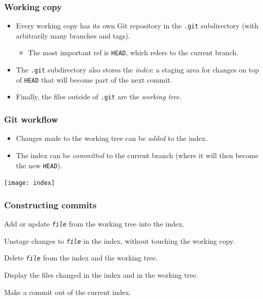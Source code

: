 \documentclass{beamer}
\begin{document}
\begin{frame}
  \frametitle{Working copy}
  \begin{itemize}
  \item Every working copy has its own Git repository in the
    \texttt{.git} subdirectory (with arbitrarily many branches and
    tags).
    \begin{itemize}
    \item The most important ref is \texttt{HEAD}, which refers to the
      current branch.
    \end{itemize}
  \item The \texttt{.git} subdirectory also stores the \emph{index}: a
    staging area for changes on top of \texttt{HEAD} that will become
    part of the next commit.
  \item Finally, the files outside of \texttt{.git} are the
    \emph{working tree}.
  \end{itemize}
\end{frame}

\begin{frame}
  \frametitle{Git workflow}
  \begin{itemize}
  \item Changes made to the working tree can be \emph{added} to the
    index.
  \item The index can be \emph{committed} to the current branch (where
    it will then become the new \texttt{HEAD}).
  \end{itemize}

  \begin{center}
    \texttt{[image: index]}
  \end{center}
\end{frame}

\begin{frame}
  \frametitle{Constructing commits}
  \begin{description}
  \item[\texttt{git add \textit{file}}] Add or update
    \texttt{\textit{file}} from the working tree into the index.
  \item[\texttt{git reset \textit{file}}] Unstage changes to
    \texttt{\textit{file}} in the index, without touching the working
    copy.
  \item[\texttt{git rm \textit{file}}] Delete \texttt{\textit{file}}
    from the index and the working tree.
  \item[\texttt{git status}] Display the files changed in the index
    and in the working tree.
  \item[\texttt{git commit}] Make a commit out of the current index.
  \end{description}
\end{frame}
\end{document}
